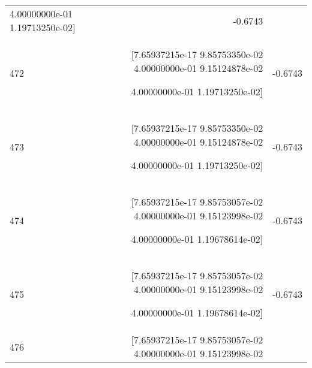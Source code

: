 \begin{longtable}{lrr}
 4.00000000e-01 1.19713250e-02] & -0.6743 \\
472 & [7.65937215e-17 9.85753350e-02 4.00000000e-01 9.15124878e-02

 4.00000000e-01 1.19713250e-02] & -0.6743 \\
473 & [7.65937215e-17 9.85753350e-02 4.00000000e-01 9.15124878e-02

 4.00000000e-01 1.19713250e-02] & -0.6743 \\
474 & [7.65937215e-17 9.85753057e-02 4.00000000e-01 9.15123998e-02

 4.00000000e-01 1.19678614e-02] & -0.6743 \\
475 & [7.65937215e-17 9.85753057e-02 4.00000000e-01 9.15123998e-02

 4.00000000e-01 1.19678614e-02] & -0.6743 \\
476 & [7.65937215e-17 9.85753057e-02 4.00000000e-01 9.15123998e-02


\end{longtable}
